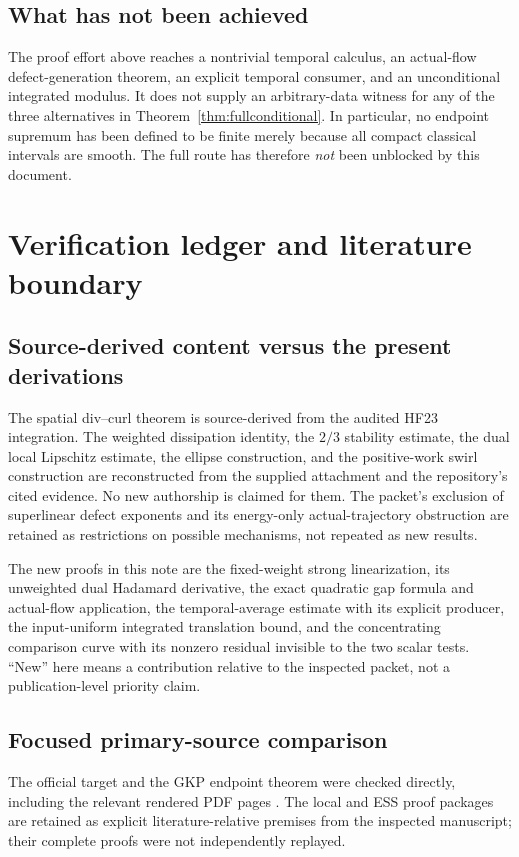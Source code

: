 \documentclass[11pt,a4paper]{article}
\theoremstyle{definition}\newtheorem{definition}[theorem]{Definition}
\theoremstyle{remark}\newtheorem{remark}[theorem]{Remark}
\numberwithin{equation}{section}
\begin{document}
\subsection{What has not been achieved}
The proof effort above reaches a nontrivial temporal calculus, an actual-flow defect-generation theorem, an explicit temporal consumer, and an unconditional integrated modulus. It does not supply an arbitrary-data witness for any of the three alternatives in Theorem~\ref{thm:fullconditional}. In particular, no endpoint supremum has been defined to be finite merely because all compact classical intervals are smooth. The full route has therefore \emph{not} been unblocked by this document.

\section{Verification ledger and literature boundary}
\label{sec:ledger}
\subsection{Source-derived content versus the present derivations}
The spatial div--curl theorem is source-derived from the audited HF23 integration. The weighted dissipation identity, the $2/3$ stability estimate, the dual local Lipschitz estimate, the ellipse construction, and the positive-work swirl construction are reconstructed from the supplied attachment and the repository's cited evidence. No new authorship is claimed for them. The packet's exclusion of superlinear defect exponents and its energy-only actual-trajectory obstruction are retained as restrictions on possible mechanisms, not repeated as new results.

The new proofs in this note are the fixed-weight strong linearization, its unweighted dual Hadamard derivative, the exact quadratic gap formula and actual-flow application, the temporal-average estimate with its explicit producer, the input-uniform integrated translation bound, and the concentrating comparison curve with its nonzero residual invisible to the two scalar tests. ``New'' here means a contribution relative to the inspected packet, not a publication-level priority claim.

\subsection{Focused primary-source comparison}
The official target and the GKP endpoint theorem were checked directly, including the relevant rendered PDF pages \cite{Clay,GKP}. The local and ESS proof packages are retained as explicit literature-relative premises from the inspected manuscript; their complete proofs were not independently replayed.
\end{document}
